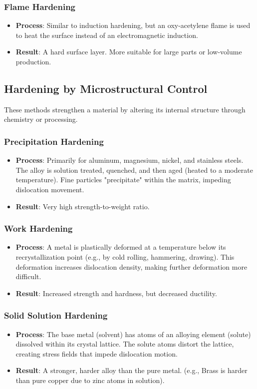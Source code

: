 \subsubsection{Flame Hardening}
\begin{itemize}
  \item \textbf{Process}: Similar to induction hardening, but an oxy-acetylene flame is used to heat the surface instead of an electromagnetic induction.
  \item \textbf{Result}: A hard surface layer. More suitable for large parts or low-volume production.
\end{itemize}


\subsection{Hardening by Microstructural Control}
These methods strengthen a material by altering its internal structure through chemistry or processing.
\subsubsection{Precipitation Hardening}
\begin{itemize}
  \item \textbf{Process}: Primarily for aluminum, magnesium, nickel, and stainless steels. The alloy is solution treated, quenched, and then aged (heated to a moderate temperature). Fine particles "precipitate" within the matrix, impeding dislocation movement.
  \item \textbf{Result}: Very high strength-to-weight ratio.
\end{itemize}

\subsubsection{Work Hardening}
\begin{itemize}
  \item \textbf{Process}: A metal is plastically deformed at a temperature below its recrystallization point (e.g., by cold rolling, hammering, drawing). This deformation increases dislocation density, making further deformation more difficult.
  \item \textbf{Result}: Increased strength and hardness, but decreased ductility.
\end{itemize}

\subsubsection{Solid Solution Hardening}
\begin{itemize}
  \item \textbf{Process}: The base metal (solvent) has atoms of an alloying element (solute) dissolved within its crystal lattice. The solute atoms distort the lattice, creating stress fields that impede dislocation motion.
  \item \textbf{Result}: A stronger, harder alloy than the pure metal. (e.g., Brass is harder than pure copper due to zinc atoms in solution).
\end{itemize}


